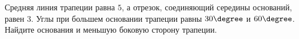 \begin{ex}
	\begin{condition}
		Средняя линия трапеции равна \( 5 \), а отрезок, соединяющий середины оснований, равен \( 3 \). Углы при большем основании трапеции равны \( 30\degree\) и \( 60\degree\). Найдите основания и меньшую боковую сторону трапеции.
	\end{condition}
\end{ex}